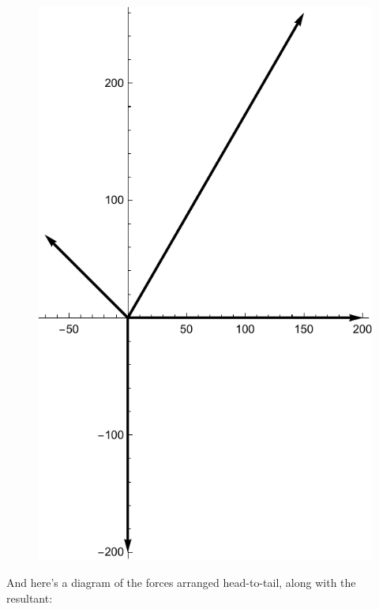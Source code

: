 \documentclass{amsart}
\begin{document}
\begin{figure}[h]
\includegraphics[scale=0.4]{2-5a}
\end{figure}

And here's a diagram of the forces arranged head-to-tail, along with the resultant:
\end{document}

